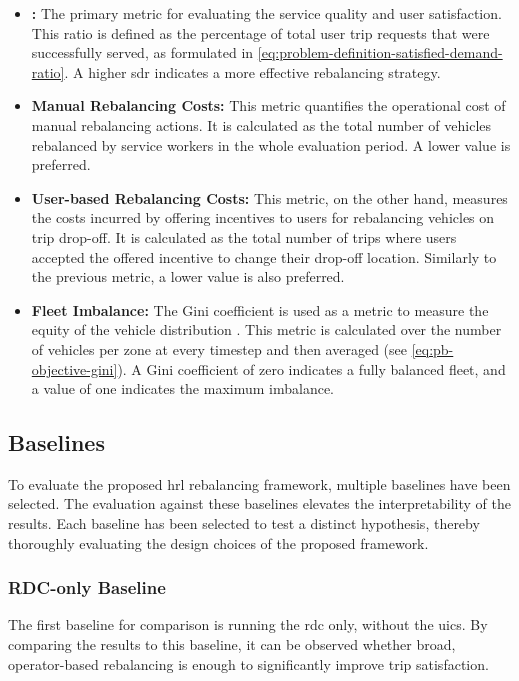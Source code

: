 \begin{itemize}
    \item \textbf{:} 
        The primary metric for evaluating the service quality and user satisfaction.
        This ratio is defined as the percentage of total user trip requests that were successfully served, as formulated in \autoref{eq:problem-definition-satisfied-demand-ratio}.
        A higher \gls{sdr} indicates a more effective rebalancing strategy.
    \item \textbf{Manual Rebalancing Costs:}
        This metric quantifies the operational cost of manual rebalancing actions.
        It is calculated as the total number of vehicles rebalanced by service workers in the whole evaluation period.
        A lower value is preferred.
    \item \textbf{User-based Rebalancing Costs:}
        This metric, on the other hand, measures the costs incurred by offering incentives to users for rebalancing vehicles on trip drop-off.
        It is calculated as the total number of trips where users accepted the offered incentive to change their drop-off location.
        Similarly to the previous metric, a lower value is also preferred.
    \item \textbf{Fleet Imbalance:}
        The Gini coefficient is used as a metric to measure the equity of the vehicle distribution \cite{cederle_fairness-oriented_2025}.
        This metric is calculated over the number of vehicles per zone at every timestep and then averaged (see \autoref{eq:pb-objective-gini}).
        A Gini coefficient of zero indicates a fully balanced fleet, and a value of one indicates the maximum imbalance.
\end{itemize}

\subsection{Baselines}\label{sec:evaluation-setup-baselines}
To evaluate the proposed \gls{hrl} rebalancing framework, multiple baselines have been selected.
The evaluation against these baselines elevates the interpretability of the results.
Each baseline has been selected to test a distinct hypothesis, thereby thoroughly evaluating the design choices of the proposed framework.

\subsubsection{RDC-only Baseline}
The first baseline for comparison is running the \gls{rdc} only, without the \glspl{uic}.
By comparing the results to this baseline, it can be observed whether broad, operator-based rebalancing is enough to significantly improve trip satisfaction.


